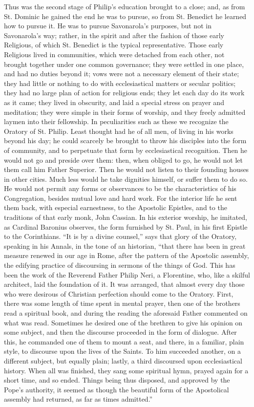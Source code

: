 Thus was the second stage of Philip's education
brought to a close; and, as from St. Dominic he gained
the end he was to pursue, so from St. Benedict he learned
how to pursue it. He was to pursue Savonarola's purposes,
but not in Savonarola's way; rather, in the spirit and after the fashion of those early Religious, of which St.
Benedict is the typical representative. Those early
Religious lived in communities, which were detached from
each other, not brought together under one common
governance; they were settled in one place, and had no
duties beyond it; vows were not a necessary element of
their state; they had little or nothing to do with
ecclesiastical matters or secular politics; they had no
large plan of action for religious ends; they let each
day do its work as it came; they lived in obscurity, and
laid a special stress on prayer and meditation; they were
simple in their forms of worship, and they freely
admitted laymen into their fellowship. In peculiarities
such as these we recognize the Oratory of St. Philip.
Least thought had he of all men, of living in his works
beyond his day; he could scarcely be brought to throw his
disciples into the form of community, and to perpetuate
that form by ecclesiastical recognition. Then he would
not go and preside over them: then, when obliged to go,
he would not let them call him Father Superior. Then he
would not listen to their founding houses in other
cities. Much less would he take dignities himself, or
suffer them to do so. He would not permit any forms or
observances to be the characteristics of his
Congregation, besides mutual love and hard work. For the
interior life he sent them back, with especial
earnestness, to the Apostolic Epistles, and to the
traditions of that early monk, John Cassian. In his
exterior worship, he imitated, as Cardinal Baronius
observes, the form furnished by St. Paul, in his first
Epistle to the Corinthians. ``It is by a divine
counsel,'' says that glory of the Oratory, speaking
in his Annals, in the tone of an historian, ``that
there has been in great measure renewed in our age in
Rome, after the pattern of the Apostolic assembly, the
edifying practice of discoursing in sermons of the things
of God. This has been the work of the Reverend Father
Philip Neri, a Florentine, who, like a skilful architect,
laid the foundation of it. It was arranged, that almost
every day those who were desirous of Christian perfection
should come to the Oratory. First, there was some length
of time spent in mental prayer, then one of the brothers
read a spiritual book, and during the reading the
aforesaid Father commented on what was read. Sometimes he
desired one of the brethren to give his opinion on some
subject, and then the discourse proceeded in the form of
dialogue. After this, he commanded one of them to mount a
seat, and there, in a familiar, plain style, to discourse
upon the lives of the Saints. To him succeeded another,
on a different subject, but equally plain; lastly, a
third discoursed upon ecclesiastical history. When all
was finished, they sang some spiritual hymn, prayed again
for a short time, and so ended. Things being thus
disposed, and approved by the Pope's authority, it seemed
as though the beautiful form of the Apostolical assembly
had returned, as far as times admitted.''

